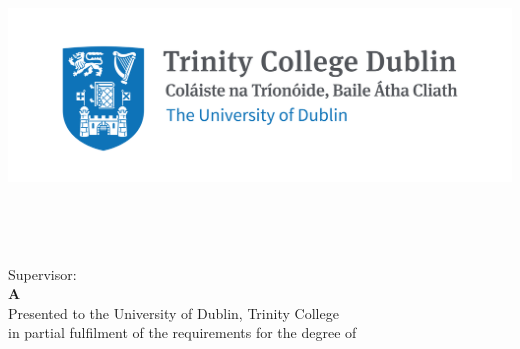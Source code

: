\begin{titlepage}

\center %



\includegraphics{title/Trinity_RGB_transparent_main.png}\\[1cm] 

\Large \school\\[1.5cm] %
\ifdefined\department
\large \department\\[1.5cm] %
\fi
\large
\makeatletter
{ \Large \bfseries \thesistitle}\\[1.5cm] %
 


\authorname\\[.5cm] %
Supervisor: \supervisor\\[3cm]

{ \large \bfseries A \typeofthesis } \\
Presented to the University of Dublin, Trinity College \\
in partial fulfilment of the requirements for the degree of \\
{ \large \bfseries \degree } \\[3cm]


\end{titlepage}
